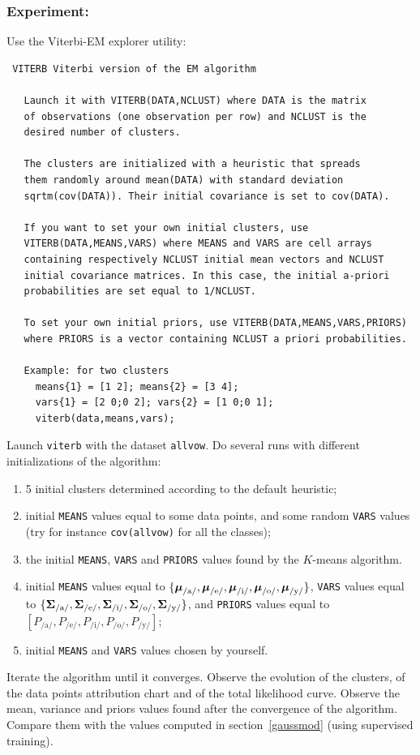 \documentclass[a4paper]{article}
\newcommand{\com}[1]{{\tt #1}}
\newcommand{\muv}{\ensuremath\boldsymbol{\mu}}  %
\newcommand{\Sm}{\ensuremath\boldsymbol{\Sigma}}  %
\begin{document}
\subsubsection*{Experiment:}
Use the Viterbi-EM explorer utility:
\begin{verbatim}
 VITERB Viterbi version of the EM algorithm

   Launch it with VITERB(DATA,NCLUST) where DATA is the matrix
   of observations (one observation per row) and NCLUST is the
   desired number of clusters.

   The clusters are initialized with a heuristic that spreads
   them randomly around mean(DATA) with standard deviation
   sqrtm(cov(DATA)). Their initial covariance is set to cov(DATA).

   If you want to set your own initial clusters, use
   VITERB(DATA,MEANS,VARS) where MEANS and VARS are cell arrays
   containing respectively NCLUST initial mean vectors and NCLUST
   initial covariance matrices. In this case, the initial a-priori
   probabilities are set equal to 1/NCLUST.

   To set your own initial priors, use VITERB(DATA,MEANS,VARS,PRIORS)
   where PRIORS is a vector containing NCLUST a priori probabilities.

   Example: for two clusters
     means{1} = [1 2]; means{2} = [3 4];
     vars{1} = [2 0;0 2]; vars{2} = [1 0;0 1];
     viterb(data,means,vars);

\end{verbatim}
Launch \com{viterb} with the dataset \com{allvow}. Do several runs
with different initializations of the algorithm:
\begin{enumerate}
\item 5 initial clusters determined according to the default heuristic;
\item initial \com{MEANS} values equal to some data points, and some
  random \com{VARS} values (try for instance \com{cov(allvow)} for all
  the classes);
\item the initial \com{MEANS}, \com{VARS} and \com{PRIORS} values
  found by the $K$-means algorithm.
\item initial \com{MEANS} values equal to $\{\muv_{\text{/a/}},
  \muv_{\text{/e/}}, \muv_{\text{/i/}}, \muv_{\text{/o/}},
  \muv_{\text{/y/}}\}$, \com{VARS} values equal to \linebreak
  $\{\Sm_{\text{/a/}}, \Sm_{\text{/e/}}, \Sm_{\text{/i/}},
  \Sm_{\text{/o/}}, \Sm_{\text{/y/}}\}$, and \com{PRIORS} values
  equal to
  $[P_{\text{/a/}},P_{\text{/e/}},P_{\text{/i/}},P_{\text{/o/}},P_{\text{/y/}}]$;
\item initial \com{MEANS} and \com{VARS} values chosen by yourself.
\end{enumerate}
Iterate the algorithm until it converges. Observe the evolution of the
clusters, of the data points attribution chart and of the total
likelihood curve. Observe the mean, variance and priors values found
after the convergence of the algorithm. Compare them with the values
computed in section~\ref{gaussmod} (using supervised training).
\end{document}
